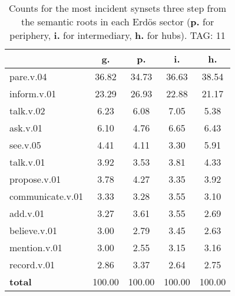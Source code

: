 \begin{table}[h!]
\begin{center}
\begin{tabular}{| l | c | c | c | c |}\hline
 & g. & p. & i. & h. \\\hline
pare.v.04 & 36.82  & 34.73  & 36.63  & 38.54 \\\hline
inform.v.01 & 23.29  & 26.93  & 22.88  & 21.17 \\\hline
talk.v.02 & 6.23  & 6.08  & 7.05  & 5.38 \\\hline
ask.v.01 & 6.10  & 4.76  & 6.65  & 6.43 \\\hline
see.v.05 & 4.41  & 4.11  & 3.30  & 5.91 \\\hline
talk.v.01 & 3.92  & 3.53  & 3.81  & 4.33 \\\hline
propose.v.01 & 3.78  & 4.27  & 3.35  & 3.92 \\\hline
communicate.v.01 & 3.33  & 3.28  & 3.55  & 3.10 \\\hline
add.v.01 & 3.27  & 3.61  & 3.55  & 2.69 \\\hline
believe.v.01 & 3.00  & 2.79  & 3.45  & 2.63 \\\hline
mention.v.01 & 3.00  & 2.55  & 3.15  & 3.16 \\\hline
record.v.01 & 2.86  & 3.37  & 2.64  & 2.75 \\\hline
{{\bf total}} & 100.00  & 100.00  & 100.00  & 100.00 \\\hline
\end{tabular}
\caption{Counts for the most incident synsets three step from the semantic roots in each Erd\"os sector ({\bf p.} for periphery, {\bf i.} for intermediary, {\bf h.} for hubs). TAG: 11}
\end{center}
\end{table}